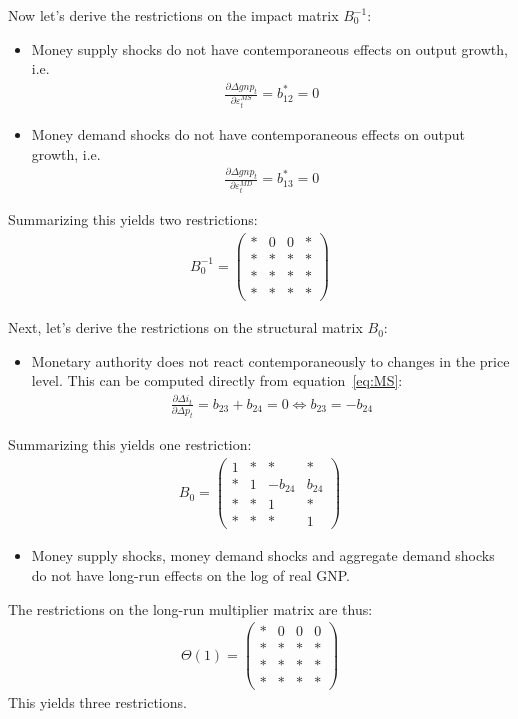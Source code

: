 \begin{enumerate}
Now let's derive the restrictions on the impact matrix \(B_{0}^{-1}\):
\begin{itemize}
\item Money supply shocks do not have contemporaneous effects on output growth, i.e.\
\begin{align*}
\frac{\partial \Delta gnp_t}{\partial \varepsilon_t^{MS}}= b^*_{12} = 0
\end{align*}

\item Money demand shocks do not have contemporaneous effects on output growth, i.e.\
\begin{align*}
\frac{\partial \Delta gnp_t}{\partial \varepsilon_t^{MD}}= b^*_{13} = 0	
\end{align*}
\end{itemize}
Summarizing this yields two restrictions:
\begin{align*}
B_{0}^{-1} =
\begin{pmatrix}
* & 0 & 0 & *\\
* & * & * & *\\
* & * & * & *\\
* & * & * & *
\end{pmatrix}
\end{align*}

Next, let's derive the restrictions on the structural matrix \(B_{0}\):
\begin{itemize}
\item Monetary authority does not react contemporaneously to changes in the price level.
This can be computed directly from equation~\eqref{eq:MS}:
\begin{align*}
\frac{\partial \Delta i_t}{\partial \Delta p_t}= b_{23} + b_{24} = 0 \Leftrightarrow b_{23} = -b_{24}
\end{align*}
\end{itemize}
Summarizing this yields one restriction:
\begin{align*}
B_{0} =
\begin{pmatrix}
1 & * & * & *\\
* & 1 & -b_{24} & b_{24}\\
* & * & 1 & *\\
* & * & * & 1
\end{pmatrix}
\end{align*}

\begin{itemize}
\item Money supply shocks, money demand shocks and aggregate demand shocks do not have long-run effects on the log of real GNP.
\end{itemize}
The restrictions on the long-run multiplier matrix are thus:
\begin{align*}
\Theta(1) =
\begin{pmatrix}
* & 0 & 0 & 0\\
* & * & * & *\\
* & * & * & *\\
* & * & * & *
\end{pmatrix}
\end{align*}
This yields three restrictions.


\end{enumerate}
